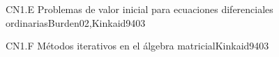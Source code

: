 \begin{syllabus}
\begin{unit}{CN1.E Problemas de valor inicial para ecuaciones diferenciales ordinarias}{Burden02,Kinkaid94}{0}{3}
   \begin{learningoutcomes}
      \item \CNONEObjONE
      \item \CNONEObjTWO
      \item \CNONEObjTHREE
      \item \CNONEObjFOUR
   \end{learningoutcomes}
\end{unit}

\begin{unit}{CN1.F Métodos iterativos en el álgebra matricial}{Kinkaid94}{0}{3}
\begin{topics}
      \item \CNONETopicLinear
      \item \CNONETopicFinite
   \end{topics}

   \begin{learningoutcomes}
      \item \CNONEObjONE
      \item \CNONEObjTWO
      \item \CNONEObjTHREE
      \item \CNONEObjFOUR
   \end{learningoutcomes}
\end{unit}



\begin{coursebibliography}
\end{coursebibliography}

\end{syllabus}

